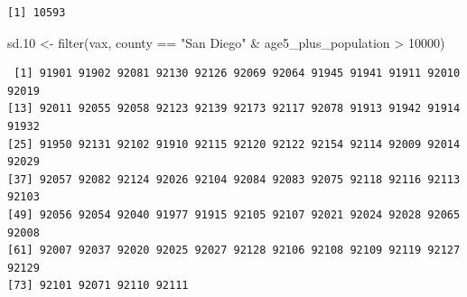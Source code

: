 \documentclass[
  letterpaper,
  DIV=11,
  numbers=noendperiod]{scrartcl}
\newenvironment{Shaded}{\begin{snugshade}}{\end{snugshade}}
\newcommand{\DecValTok}[1]{\textcolor[rgb]{0.68,0.00,0.00}{#1}}
\newcommand{\FloatTok}[1]{\textcolor[rgb]{0.68,0.00,0.00}{#1}}
\newcommand{\FunctionTok}[1]{\textcolor[rgb]{0.28,0.35,0.67}{#1}}
\newcommand{\NormalTok}[1]{\textcolor[rgb]{0.00,0.23,0.31}{#1}}
\newcommand{\OtherTok}[1]{\textcolor[rgb]{0.00,0.23,0.31}{#1}}
\newcommand{\SpecialCharTok}[1]{\textcolor[rgb]{0.37,0.37,0.37}{#1}}
\newcommand{\StringTok}[1]{\textcolor[rgb]{0.13,0.47,0.30}{#1}}
\begin{document}
\begin{verbatim}
[1] 10593
\end{verbatim}

\begin{Shaded}
\begin{Highlighting}[]
\NormalTok{sd}\FloatTok{.10} \OtherTok{\textless{}{-}} \FunctionTok{filter}\NormalTok{(vax, county }\SpecialCharTok{==} \StringTok{"San Diego"} \SpecialCharTok{\&}
\NormalTok{                age5\_plus\_population }\SpecialCharTok{\textgreater{}} \DecValTok{10000}\NormalTok{)}
\end{Highlighting}
\end{Shaded}

\begin{Shaded}
\end{Shaded}

\begin{verbatim}
 [1] 91901 91902 92081 92130 92126 92069 92064 91945 91941 91911 92010 92019
[13] 92011 92055 92058 92123 92139 92173 92117 92078 91913 91942 91914 91932
[25] 91950 92131 92102 91910 92115 92120 92122 92154 92114 92009 92014 92029
[37] 92057 92082 92124 92026 92104 92084 92083 92075 92118 92116 92113 92103
[49] 92056 92054 92040 91977 91915 92105 92107 92021 92024 92028 92065 92008
[61] 92007 92037 92020 92025 92027 92128 92106 92108 92109 92119 92127 92129
[73] 92101 92071 92110 92111
\end{verbatim}

\begin{Shaded}
\end{Shaded}
\end{document}
